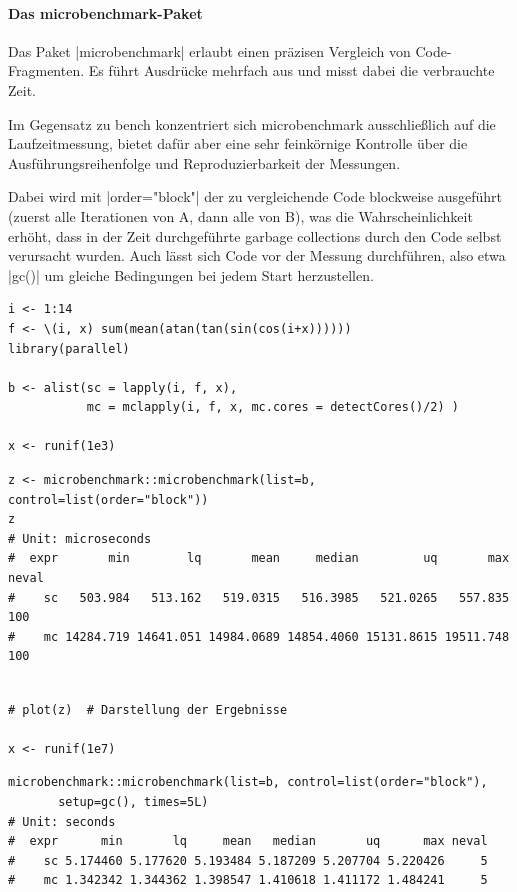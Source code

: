 \documentclass[10pt,twocolumn]{scrartcl}
\renewcommand{\lstinline}{\mycoloredinline}
\begin{document}
\paragraph{Das microbenchmark-Paket}

Das Paket \lstinline|microbenchmark| erlaubt einen präzisen Vergleich von Code-Fragmenten. Es führt Ausdrücke mehrfach aus und misst dabei die verbrauchte Zeit.

Im Gegensatz zu bench konzentriert sich microbenchmark ausschließlich auf die Laufzeitmessung, bietet dafür aber eine sehr feinkörnige Kontrolle über die Ausführungsreihenfolge und Reproduzierbarkeit der Messungen.

Dabei wird mit \lstinline|order="block"| der zu vergleichende Code blockweise ausgeführt (zuerst alle Iterationen von A, dann alle von B), was die Wahrscheinlichkeit erhöht, dass in der Zeit durchgeführte garbage collections durch den Code selbst verursacht wurden. Auch lässt sich Code vor der Messung durchführen, also etwa \lstinline|gc()| um gleiche Bedingungen bei jedem Start herzustellen.

\begin{lstlisting}
i <- 1:14
f <- \(i, x) sum(mean(atan(tan(sin(cos(i+x))))))
library(parallel)

b <- alist(sc = lapply(i, f, x),
           mc = mclapply(i, f, x, mc.cores = detectCores()/2) )

x <- runif(1e3)
\end{lstlisting}
\begin{lstlisting}[aboveskip=-2pt,basicstyle=\fontsize{8.4pt}{8.7pt}\selectfont\ttfamily]
z <- microbenchmark::microbenchmark(list=b, control=list(order="block"))
z
# Unit: microseconds
#  expr       min        lq       mean     median         uq       max neval
#    sc   503.984   513.162   519.0315   516.3985   521.0265   557.835   100
#    mc 14284.719 14641.051 14984.0689 14854.4060 15131.8615 19511.748   100
\end{lstlisting}
\begin{lstlisting}[aboveskip=-2pt]

# plot(z)  # Darstellung der Ergebnisse

x <- runif(1e7)
\end{lstlisting}
\begin{lstlisting}[aboveskip=-2pt,basicstyle=\fontsize{9.6pt}{9.9pt}\selectfont\ttfamily]
microbenchmark::microbenchmark(list=b, control=list(order="block"),
       setup=gc(), times=5L)
# Unit: seconds
#  expr      min       lq     mean   median       uq      max neval
#    sc 5.174460 5.177620 5.193484 5.187209 5.207704 5.220426     5
#    mc 1.342342 1.344362 1.398547 1.410618 1.411172 1.484241     5
\end{lstlisting}
\end{document}
